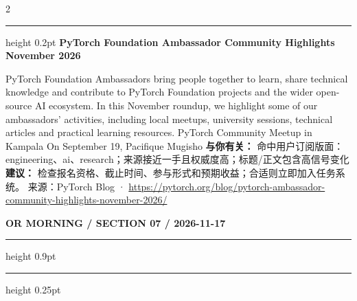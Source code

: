 \documentclass[10.5pt]{ctexart}
\begin{document}
\begin{multicols}{2}
\vspace{2mm}
\hrule height 0.2pt
\vspace{2mm}
{\large\bfseries PyTorch Foundation Ambassador Community Highlights November 2026}\par
PyTorch Foundation Ambassadors bring people together to learn, share technical knowledge and contribute to PyTorch Foundation projects and the wider open-source AI ecosystem. In this November roundup, we highlight some of our ambassadors’ activities, including local meetups, university sessions, technical articles and practical learning resources. PyTorch Community Meetup in Kampala On September 19, Pacifique Mugisho
\textbf{与你有关：} 命中用户订阅版面：engineering、ai、research；来源接近一手且权威度高；标题/正文包含高信号变化
\textbf{建议：} 检查报名资格、截止时间、参与形式和预期收益；合适则立即加入任务系统。
{\footnotesize\color{ormuted} 来源：PyTorch Blog · \url{https://pytorch.org/blog/pytorch-ambassador-community-highlights-november-2026/}}
\end{multicols}
\newpage
{\small\bfseries OR MORNING / SECTION 07 / 2026-11-17}
\vspace{2mm}
\hrule height 0.9pt
\vspace{1.5mm}
\hrule height 0.25pt
\vspace{4mm}
\end{document}
